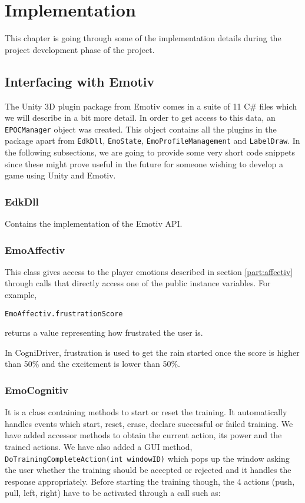 \pagestyle{fancy}

\chapter{Implementation}
\label{cha:implementation}

This chapter is going through some of the implementation details during the project development phase of the project.

\section{Interfacing with Emotiv}
The Unity 3D plugin package from Emotiv comes in a suite of 11 C\# files which we will describe in a bit more detail. In order to get access to this data, an  \texttt{EPOCManager} object was created. This object contains all the plugins in the package apart from  \texttt{EdkDll}, \texttt{EmoState}, \texttt{EmoProfileManagement} and \texttt{LabelDraw}. In the following subsections, we are going to provide some very short code snippets since these might prove useful in the future for someone wishing to develop a game using Unity and Emotiv.

\subsection{EdkDll}
Contains the implementation of the Emotiv API.

\subsection{EmoAffectiv} 
This class gives access to the player emotions described in section \ref{part:affectiv} through calls that directly access one of the public instance variables. For example,

\begin{Verbatim}[frame=single, framesep=3mm]
EmoAffectiv.frustrationScore
\end{Verbatim}

returns a value representing how frustrated the user is.

In CogniDriver, frustration is used to get the rain started once the score is higher than 50\% and the excitement is lower than 50\%. 

\subsection{EmoCognitiv} 
It is a class containing methods to start or reset the training. It automatically handles events which start, reset, erase, declare successful or failed training. We have added accessor methods to obtain the current action, its power and the trained actions. We have also added a GUI method, \texttt{DoTrainingCompleteAction(int windowID)} which pops up the window asking the user whether the training should be accepted or rejected and it handles the response appropriately. Before starting the training though, the 4 actions (push, pull, left, right) have to be activated through a call such as: 

